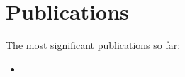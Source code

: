 \section*{Publications}

The most significant publications so far:

\begin{itemize}[leftmargin=3em]
    \item[\cite{Sokolowski2024Automated}] %
        \numdef{\origmaxcitenames}{\getmaxcitenames{}}\setmaxcitenames{\origmaxcitenames}
\end{itemize}
